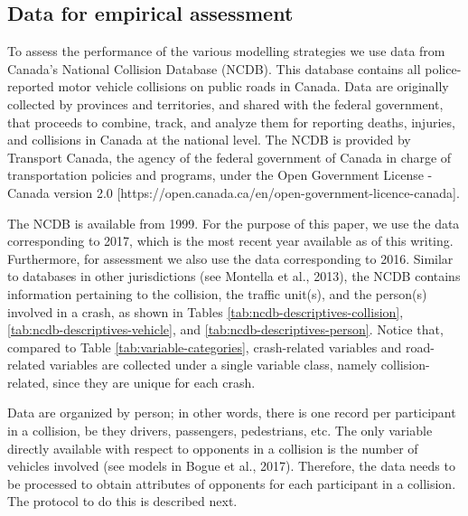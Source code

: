 \documentclass[]{elsarticle} %
\begin{document}
\hypertarget{data-for-empirical-assessment}{%
\subsection{Data for empirical
assessment}\label{data-for-empirical-assessment}}

To assess the performance of the various modelling strategies we use
data from Canada's National Collision Database (NCDB). This database
contains all police-reported motor vehicle collisions on public roads in
Canada. Data are originally collected by provinces and territories, and
shared with the federal government, that proceeds to combine, track, and
analyze them for reporting deaths, injuries, and collisions in Canada at
the national level. The NCDB is provided by Transport Canada, the agency
of the federal government of Canada in charge of transportation policies
and programs, under the Open Government License - Canada version 2.0
{[}https://open.canada.ca/en/open-government-licence-canada{]}.

The NCDB is available from 1999. For the purpose of this paper, we use
the data corresponding to 2017, which is the most recent year available
as of this writing. Furthermore, for assessment we also use the data
corresponding to 2016. Similar to databases in other jurisdictions (see
Montella et al., 2013), the NCDB contains information pertaining to the
collision, the traffic unit(s), and the person(s) involved in a crash,
as shown in Tables \ref{tab:ncdb-descriptives-collision},
\ref{tab:ncdb-descriptives-vehicle}, and
\ref{tab:ncdb-descriptives-person}. Notice that, compared to Table
\ref{tab:variable-categories}, crash-related variables and road-related
variables are collected under a single variable class, namely
collision-related, since they are unique for each crash.

Data are organized by person; in other words, there is one record per
participant in a collision, be they drivers, passengers, pedestrians,
etc. The only variable directly available with respect to opponents in a
collision is the number of vehicles involved (see models in Bogue et
al., 2017). Therefore, the data needs to be processed to obtain
attributes of opponents for each participant in a collision. The
protocol to do this is described next.

\begingroup\fontsize{7}{9}\selectfont
\end{document}
